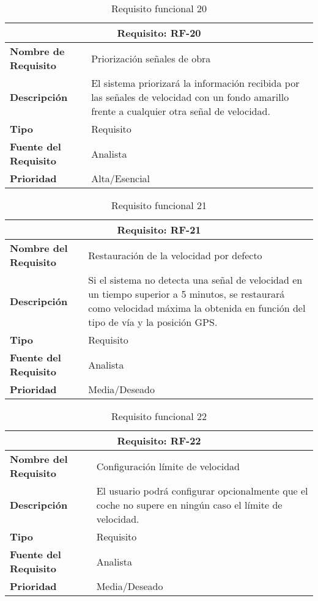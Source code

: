 \begin{table}[H]
\begin{center}
\begin{tabular}{p{} p{7cm}}
\multicolumn{2}{c}{\textbf{Requisito: RF-20} } \\
\hline \hline
\textbf{Nombre de Requisito} & Priorización señales de obra\\
\hline
\textbf{Descripción} & El sistema priorizará la información recibida por las señales de velocidad con un fondo amarillo frente a cualquier otra señal de velocidad. \\
\hline
\textbf{Tipo} & Requisito \\
\hline
\textbf{Fuente del Requisito} & Analista \\
\hline
\textbf{Prioridad} & Alta/Esencial \\ \hline
\end{tabular}
\caption{Requisito funcional 20}
\label{tab:RF-20}
\end{center}
\end{table}

\begin{table}[H]
\begin{center}
\begin{tabular}{p{} p{7cm}}
\multicolumn{2}{c}{\textbf{Requisito: RF-21} } \\
\hline \hline
\textbf{Nombre del Requisito} & Restauración de la velocidad por defecto \\
\hline
\textbf{Descripción} & Si el sistema no detecta una señal de velocidad en un tiempo superior a 5 minutos, se restaurará como velocidad máxima la obtenida en función del tipo de vía y la posición GPS.  \\
\hline
\textbf{Tipo} & Requisito  \\
\hline
\textbf{Fuente del Requisito} & Analista  \\
\hline
\textbf{Prioridad} & Media/Deseado  \\ \hline
\end{tabular}
\caption{Requisito funcional 21}
\label{tab:RF-21}
\end{center}
\end{table}

\begin{table}[H]
\begin{center}
\begin{tabular}{p{} p{7cm}}
\multicolumn{2}{c}{\textbf{Requisito: RF-22} } \\
\hline \hline
\textbf{Nombre del Requisito} & Configuración límite de velocidad \\
\hline
\textbf{Descripción} & El usuario podrá configurar opcionalmente que el coche no supere en ningún caso el límite de velocidad. \\
\hline
\textbf{Tipo} & Requisito  \\
\hline
\textbf{Fuente del Requisito} & Analista  \\
\hline
\textbf{Prioridad} & Media/Deseado  \\ \hline
\end{tabular}
\caption{Requisito funcional 22}
\label{tab:RF-22}
\end{center}
\end{table}


